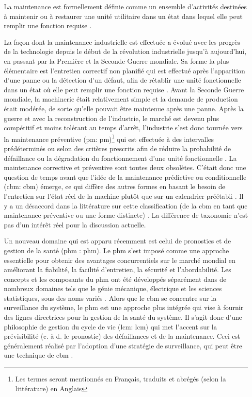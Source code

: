 La maintenance est formellement définie comme un ensemble d’activités destinées à maintenir ou à restaurer une unité utilitaire dans un état dans lequel elle peut remplir une fonction requise \cite{ISO2015}.

La façon dont la maintenance industrielle est effectuée a évolué avec les progrès de la technologie depuis le début de la révolution industrielle jusqu’à aujourd’hui, en passant par la Première et la Seconde Guerre mondiale. Sa forme la plus élémentaire est l’entretien correctif non planifié qui est effectué après l’apparition d’une panne ou la détection d’un défaut, afin de rétablir une unité fonctionnelle dans un état où elle peut remplir une fonction requise \cite{ISO2015}. Avant la Seconde Guerre mondiale, la machinerie était relativement simple et la demande de production était modérée, de sorte qu’elle pouvait être maintenue après une panne. Après la guerre et avec la reconstruction de l’industrie, le marché est devenu plus compétitif et moins tolérant au temps d’arrêt, l’industrie s’est donc tournée vers la maintenance préventive (\acrlong{pm}: \acrshort{pm})\footnote{Les termes seront mentionnés en Français, traduits et abrégés (selon la littérature) en Anglais} qui est effectuée à des intervalles prédéterminés ou selon des critères prescrits afin de réduire la probabilité de défaillance ou la dégradation du fonctionnement d’une unité fonctionnelle \cite{ISO2015}.  La maintenance corrective et préventive sont toutes deux obsolètes. %
C’était donc une question de temps avant que l’idée de la maintenance prédictive ou conditionnelle (\acrlong{cbm}: \acrshort{cbm}) émerge, ce qui diffère des autres formes en basant le besoin de l'entretien sur l’état réel de la machine plutôt que sur un calendrier préétabli \cite{Kadry2013}. Il y a un désaccord dans la littérature sur cette classification (de la \acrshort{cbm} en tant que maintenance préventive ou une forme distincte) \cite{Shin2015}. La différence de taxonomie n’est pas d’un intérêt réel pour la discussion actuelle.

Un nouveau domaine qui est apparu récemment est celui de pronostics et de gestion de la santé (\acrlong{phm} : \acrshort{phm}). Le \acrshort{phm} s’est imposé comme une approche essentielle pour obtenir des avantages concurrentiels sur le marché mondial en améliorant la fiabilité, la facilité d’entretien, la sécurité et l’abordabilité. Les concepts et les composants du \acrshort{phm} ont été développés séparément dans de nombreux domaines tels que le génie mécanique, électrique et les sciences statistiques, sous des noms variés \cite{Tsui2015}. Alors que le \acrshort{cbm} se concentre sur la surveillance du système, le \acrshort{phm} est une approche plus intégrée qui vise à fournir des lignes directrices pour la gestion de la santé du système. Il s’agit donc d’une philosophie de gestion du cycle de vie (\acrlong{lcm}: \acrshort{lcm}) qui met l’accent sur la prévisibilité (c.-à-d. le pronostic) des défaillances et de la maintenance. Ceci est généralement réalisé par l’adoption d’une stratégie de surveillance, qui peut être une technique de \acrshort{cbm} \cite{Tinga2014}.

